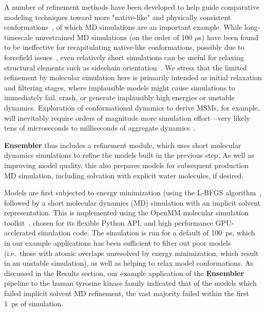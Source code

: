 \documentclass[aps,pre,twocolumn,nofootinbib,superscriptaddress,linenumbers]{revtex4-1}
\begin{document}
A number of refinement methods have been developed to help guide comparative modeling techniques toward more "native-like" and physically consistent conformations~\cite{maccallum:prot:2011:casp-refinement,zhang:curr-opin-struct-biol:2009:structure-prediction}, of which MD simulations are an important example.
While long-timescale unrestrained MD simulations (on the order of 100 $\mu$s) have been found to be ineffective for recapitulating native-like conformations, possibly due to forcefield issues~\cite{raval:prot:2012:long-timescale-md-refinement}, even relatively short simulations can be useful for relaxing structural elements such as sidechain orientation~\cite{zhang:curr-opin-struct-biol:2009:structure-prediction}.
\color{red}
We stress that the limited refinement by molecular simulation here is primarily intended as initial relaxation and filtering stages, where implausible models might cause simulations to immediately fail, crash, or generate implausibly high energies or unstable dynamics.
Exploration of conformational dynamics to derive MSMs, for example, will inevitably require orders of magnitude more simulation effort---very likely tens of microseconds to milliseconds of aggregate dynamics~\cite{pande-beauchamp-bowman:2010:methods:markov-model-review,chodera-noe:curr-opin-struct-biol:2014:msm-review}.
\color{black}

{\bf Ensembler} thus includes a refinement module, which uses short molecular dynamics simulations to refine the models built in the previous step.
As well as improving model quality, this also prepares models for subsequent production MD simulation, including solvation with explicit water molecules, if desired.

Models are first subjected to energy minimization (using the L-BFGS algorithm~\cite{lbfgs}, followed by a short molecular dynamics (MD) simulation with an implicit solvent representation.
This is implemented using the OpenMM molecular simulation toolkit~\cite{eastman:jctc:2012:openmm}, chosen for its flexible Python API, and high performance GPU-acclerated simulation code.
The simulation is run for a default of 100~ps, which in our example applications has been sufficient to filter out poor models (i.e.~those with atomic overlaps unresolved by energy minimization, which result in an unstable simulation), as well as helping to relax model conformations.
As discussed in the Results section, our example application of the {\bf Ensembler} pipeline to the human tyrosine kinase family indicated that of the models which failed implicit solvent MD refinement, the vast majority failed within the first 1~ps of simulation.
\end{document}
